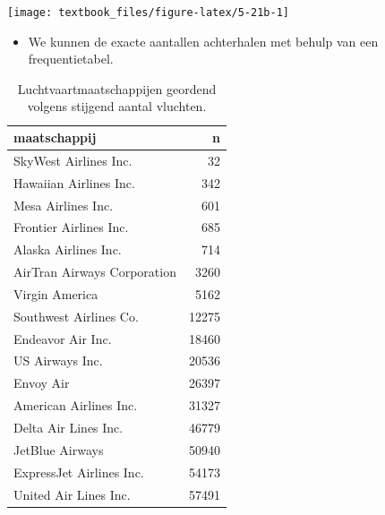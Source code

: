\documentclass[]{tufte-book}
\newenvironment{Shaded}{}{}
\newcommand{\DataTypeTok}[1]{\textcolor[rgb]{0.56,0.13,0.00}{#1}}
\newcommand{\KeywordTok}[1]{\textcolor[rgb]{0.00,0.44,0.13}{\textbf{#1}}}
\newcommand{\NormalTok}[1]{#1}
\newcommand{\OperatorTok}[1]{\textcolor[rgb]{0.40,0.40,0.40}{#1}}
\newcommand{\StringTok}[1]{\textcolor[rgb]{0.25,0.44,0.63}{#1}}
\providecommand{\tightlist}{%
  \setlength{\itemsep}{0pt}\setlength{\parskip}{0pt}}
\begin{document}
\begin{Shaded}
\end{Shaded}

\texttt{[image: textbook\_files/figure-latex/5-21b-1]}

\begin{itemize}
\tightlist
\item
  We kunnen de exacte aantallen achterhalen met behulp van een frequentietabel.
\end{itemize}

\begin{Shaded}
\end{Shaded}

\begin{table}

\caption{\label{tab:5-22b}Luchtvaartmaatschappijen geordend volgens stijgend aantal vluchten.}
\centering
\fontsize{10}{12}\selectfont
\begin{tabular}[t]{lr}
\toprule
maatschappij & n\\
\midrule
SkyWest Airlines Inc. & 32\\
Hawaiian Airlines Inc. & 342\\
Mesa Airlines Inc. & 601\\
Frontier Airlines Inc. & 685\\
Alaska Airlines Inc. & 714\\
\addlinespace
AirTran Airways Corporation & 3260\\
Virgin America & 5162\\
Southwest Airlines Co. & 12275\\
Endeavor Air Inc. & 18460\\
US Airways Inc. & 20536\\
\addlinespace
Envoy Air & 26397\\
American Airlines Inc. & 31327\\
Delta Air Lines Inc. & 46779\\
JetBlue Airways & 50940\\
ExpressJet Airlines Inc. & 54173\\
\addlinespace
United Air Lines Inc. & 57491\\
\bottomrule
\end{tabular}
\end{table}
\end{document}
